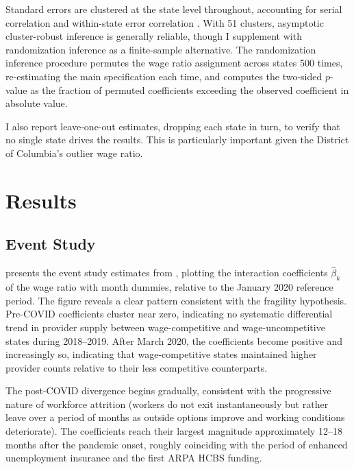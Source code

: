 \documentclass[12pt]{article}
\begin{document}
Standard errors are clustered at the state level throughout, accounting for serial correlation and within-state error correlation \citep{bertrand2004how, moulton1990illustration}. With 51 clusters, asymptotic cluster-robust inference is generally reliable, though I supplement with randomization inference \citep{fisher1935design, young2019channeling} as a finite-sample alternative. The randomization inference procedure permutes the wage ratio assignment across states 500 times, re-estimating the main specification each time, and computes the two-sided $p$-value as the fraction of permuted coefficients exceeding the observed coefficient in absolute value.

I also report leave-one-out estimates, dropping each state in turn, to verify that no single state drives the results. This is particularly important given the District of Columbia's outlier wage ratio.


\section{Results}

\subsection{Event Study}

 presents the event study estimates from , plotting the interaction coefficients $\hat{\beta}_k$ of the wage ratio with month dummies, relative to the January 2020 reference period. The figure reveals a clear pattern consistent with the fragility hypothesis. Pre-COVID coefficients cluster near zero, indicating no systematic differential trend in provider supply between wage-competitive and wage-uncompetitive states during 2018--2019. After March 2020, the coefficients become positive and increasingly so, indicating that wage-competitive states maintained higher provider counts relative to their less competitive counterparts.

The post-COVID divergence begins gradually, consistent with the progressive nature of workforce attrition (workers do not exit instantaneously but rather leave over a period of months as outside options improve and working conditions deteriorate). The coefficients reach their largest magnitude approximately 12--18 months after the pandemic onset, roughly coinciding with the period of enhanced unemployment insurance and the first ARPA HCBS funding.
\end{document}
